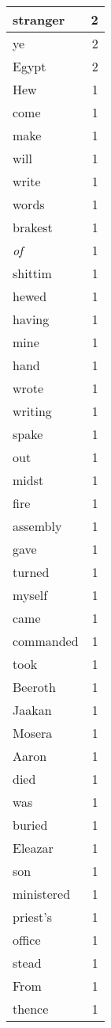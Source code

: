 \begin{center}
\begin{longtable}{l|r}
stranger & 2 \\ \hline
ye & 2 \\ \hline
Egypt & 2 \\ \hline
Hew & 1 \\ \hline
come & 1 \\ \hline
make & 1 \\ \hline
will & 1 \\ \hline
write & 1 \\ \hline
words & 1 \\ \hline
brakest & 1 \\ \hline
\emph{of} & 1 \\ \hline
shittim & 1 \\ \hline
hewed & 1 \\ \hline
having & 1 \\ \hline
mine & 1 \\ \hline
hand & 1 \\ \hline
wrote & 1 \\ \hline
writing & 1 \\ \hline
spake & 1 \\ \hline
out & 1 \\ \hline
midst & 1 \\ \hline
fire & 1 \\ \hline
assembly & 1 \\ \hline
gave & 1 \\ \hline
turned & 1 \\ \hline
myself & 1 \\ \hline
came & 1 \\ \hline
commanded & 1 \\ \hline
took & 1 \\ \hline
Beeroth & 1 \\ \hline
Jaakan & 1 \\ \hline
Mosera & 1 \\ \hline
Aaron & 1 \\ \hline
died & 1 \\ \hline
was & 1 \\ \hline
buried & 1 \\ \hline
Eleazar & 1 \\ \hline
son & 1 \\ \hline
ministered & 1 \\ \hline
priest's & 1 \\ \hline
office & 1 \\ \hline
stead & 1 \\ \hline
From & 1 \\ \hline
thence & 1 \\ \hline

\end{longtable}
\end{center}
